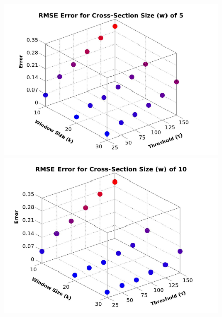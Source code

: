 \begin{figure}
\begin{center}
  \begin{minipage}{0.49\linewidth}
     \includegraphics[height=0.25\textheight,width=0.99\linewidth]{images/RMSE_Graph_CS5.jpg} 

     \includegraphics[height=0.25\textheight,width=0.99\linewidth]{images/RMSE_Graph_CS10.jpg}


\end{minipage}
\end{center}
\end{figure}
